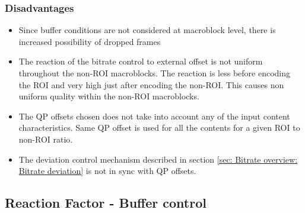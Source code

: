 \documentclass[11pt]{article} %
\begin{document}
\subsubsection*{Disadvantages}
\begin{itemize}
	\item Since buffer conditions are not considered at macroblock level, there is increased possibility of dropped frames
	\item The reaction of the bitrate control to external offset is not uniform throughout the non-ROI macroblocks. The reaction is less before encoding the ROI and very high just after encoding the non-ROI. This causes non uniform quality within the non-ROI macroblocks. 
	\item The QP offsets chosen does not take into account any of the input content characteristics. Same QP offset is used for all the contents for a given ROI to non-ROI ratio.
	\item The deviation control mechanism described in section \ref{sec: Bitrate overview: Bitrate deviation} is not in sync with QP offsets. 
\end{itemize}

\subsection{Reaction Factor - Buffer control} 
\end{document}
